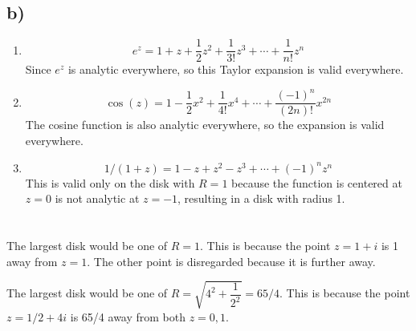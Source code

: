\documentclass[12pt]{article}
\begin{document}
\subsection{b)}
\begin{enumerate}
	\item \[ e^z = 1 + z + \dfrac{1}{2}z^2 + \dfrac{1}{3!}z^3 + \cdots + \dfrac{1}{n!} z^n \]
	Since $ e^z $ is analytic everywhere, so this Taylor expansion is valid everywhere.
	
	\item \[ \cos{(z)} = 1 - \dfrac{1}{2}x^2 + \dfrac{1}{4!}x^4 + \cdots + \dfrac{(-1)^n}{(2n)!} x^{2n} \]
	The cosine function is also analytic everywhere, so the expansion is valid everywhere.
	
	\item \[ 1/(1+z) = 1 - z + z^2 - z^3 + \cdots + (-1)^n z^n \]
	This is valid only on the disk with $ R = 1 $ because the function is centered at $ z = 0 $ is not analytic at $ z = -1 $, resulting in a disk with radius 1.
	
\end{enumerate}

\newpage

\section{}
The largest disk would be one of $ \boxed{R = 1} $. This is because the point $ z= 1 + i $ is 1 away from $ z= 1 $. The other point is disregarded because it is further away.

The largest disk would be one of $ \boxed{R = \sqrt{4^2 + \dfrac{1}{2^2}} = 65/4} $. This is because the point $ z = 1/2 + 4i $ is 65/4 away from both $ z = 0, 1 $.
\end{document}
